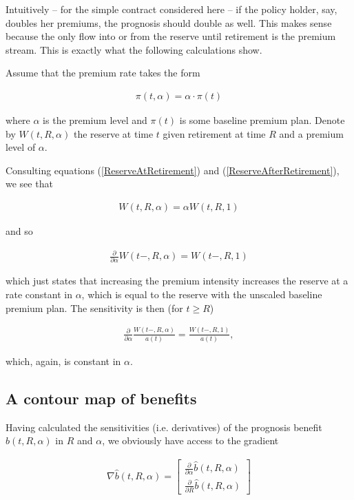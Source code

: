 \documentclass{book}
\newcommand{\1}[1]{\mathbbm{1}_{\left\lbrace #1 \right\rbrace}}
\theoremstyle{break}
\theoremstyle{remark}
\numberwithin{equation}{section}
\begin{document}
Intuitively -- for the simple contract considered here -- if the policy holder, say, doubles her premiums, the prognosis should double as well. This makes sense because the only flow into or from the reserve until retirement is the premium stream. This is exactly what the following calculations show.

Assume that the premium rate takes the form

\begin{align*}
	\pi (t,\alpha) = \alpha \cdot \pi(t)
\end{align*}

where $\alpha$ is the premium level and $\pi(t)$ is some baseline premium plan. Denote by $W(t,R,\alpha)$ the reserve at time $t$ given retirement at time $R$ and a premium level of $\alpha$.

Consulting equations (\ref{ReserveAtRetirement}) and (\ref{ReserveAfterRetirement}), we see that

\begin{align*}
	W(t,R,\alpha) = \alpha W(t,R,1)
\end{align*}

and so

\begin{align} \label{AlphaDeriv}
	\frac{\partial}{\partial \alpha }W(t-,R,\alpha) = W(t-,R,1)
\end{align}

which just states that increasing the premium intensity increases the reserve at a rate constant in $\alpha$, which is equal to the reserve with the unscaled baseline premium plan. The sensitivity is then (for $t \geq R$)

\begin{align} \label{ResDeriv}
	\frac{\partial}{\partial \alpha }\frac{W(t-,R,\alpha)}{a(t)} = \frac{W(t-,R,1)}{a(t)},
\end{align}

which, again, is constant in $\alpha$.

\subsection{A contour map of benefits}

Having calculated the sensitivities (i.e. derivatives) of the prognosis benefit $\hat{b}(t,R,\alpha)$ in $R$ and $\alpha$, we obviously have access to the gradient

\begin{align*}
	\nabla \hat{b}(t,R,\alpha) =
	\begin{bmatrix}
		\frac{\partial}{\partial \alpha }\hat{b}(t,R,\alpha) \\
		\frac{\partial}{\partial R }\hat{b}(t,R,\alpha)
	\end{bmatrix}
\end{align*}
\end{document}
